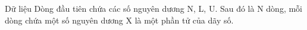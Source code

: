 Dữ liệu
Dòng đầu tiên chứa các số nguyên dương N, L, U. Sau đó là N dòng, mỗi dòng chứa một số nguyên dương X là một phần tử của dãy số.